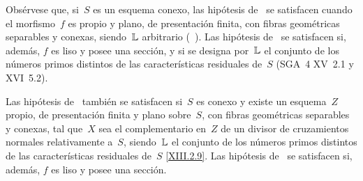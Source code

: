 
\begin{exemples}
\label{XIII.4.4}
Obsérvese que, si~$S$ es un esquema conexo, las hipótesis
de~ se satisfacen cuando el morfismo~$f$ es propio y
plano, de presentación finita, con fibras geométricas separables y
conexas, siendo~$\mathbb L$ arbitrario
(\cf~). Las hipótesis de~ se
satisfacen si, además, $f$ es liso y posee una sección, y si se
designa por~$\mathbb L$ el conjunto de los números primos distintos de las
características residuales de~$S$ (SGA~4 XV~2.1 y XVI~5.2).

Las hipótesis de~ también se satisfacen si~$S$ es conexo
y existe un esquema~$Z$ propio, de presentación finita y plano sobre~$S$,
con
fibras geométricas separables y conexas, tal que~$X$ sea
el complementario en~$Z$ de un divisor de cruzamientos normales
relativamente a~$S$, siendo~$\mathbb L$ el conjunto de los números
primos distintos de las características residuales de~$S$
\eqref{XIII.2.9}. Las hipótesis de~ se
satisfacen si, además, $f$ es liso y posee una sección.
\end{exemples}
